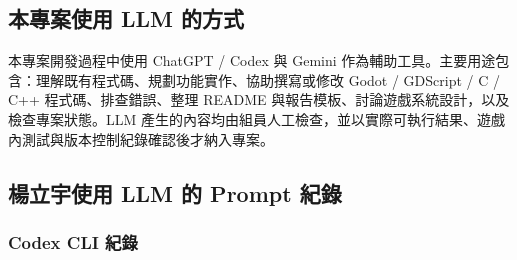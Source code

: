 \documentclass[12pt,a4paper]{article}
\begin{document}
\subsection{本專案使用 LLM 的方式}

本專案開發過程中使用 ChatGPT / Codex 與 Gemini 作為輔助工具。主要用途包含：理解既有程式碼、規劃功能實作、協助撰寫或修改 Godot / GDScript / C / C++ 程式碼、排查錯誤、整理 README 與報告模板、討論遊戲系統設計，以及檢查專案狀態。LLM 產生的內容均由組員人工檢查，並以實際可執行結果、遊戲內測試與版本控制紀錄確認後才納入專案。

\subsection{楊立宇使用 LLM 的 Prompt 紀錄}

\subsubsection{Codex CLI 紀錄}
\end{document}
